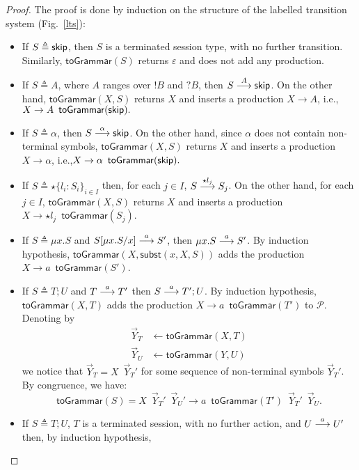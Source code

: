 \begin{proof}
The proof is done by induction on the structure of the labelled 
transition system (Fig.~\ref{lts}):
\begin{itemize}
	\item If $S\triangleq \skipk$, then $S$ is a terminated 
	      session type, with no further transition. Similarly, 
	      $\mathsf{toGrammar}(S)$ returns $\varepsilon$ and 
	      does not add any production.
	\item If $S\triangleq A$, where $A$ ranges over $!B$ and $?B$, 
	      then $S  \LTSderives[A] \skipk$. On the other hand, 
	      $\mathsf{toGrammar}(X,S)$ returns $X$ and inserts a production $X\rightarrow A$, 
	      i.e., $X\rightarrow A \enspace  \mathsf{toGrammar}(\skipk).$  
	\item If $S \triangleq \alpha$, then $S   \LTSderives[\alpha] \skipk$. 
	      On the other hand, since $\alpha$ does not contain non-terminal 
	      symbols, $\mathsf{toGrammar}(X,S)$ returns $X$ and inserts a production 
	      $X\rightarrow \alpha$, i.e.,\linebreak  $X\rightarrow \alpha \enspace 
	      \mathsf{toGrammar}(\skipk).$
	\item If $S\triangleq \star\{l_i\colon S_i\}_{i\in I}$ then, for each 
          $j\in I$, $S \LTSderives[\star l_j] S_j$. On the other hand, 
          for each $j\in I$, $\mathsf{toGrammar}(X,S)$ returns $X$ and  inserts a production 
          $X\rightarrow \star l_j \enspace \mathsf{toGrammar}(S_j)$.
	\item If $S\triangleq \mu x.S$ and $S[\mu x.S/x] \LTSderives[a] S'$, 
	      then $\mu x.S \LTSderives[a] S'$. By induction hypothesis, 
	      $\mathsf{toGrammar}(X,\mathsf{subst}(x,X,S))$ adds the production 
	      $X \rightarrow a\enspace  \mathsf{toGrammar}(S')$.
	\item If $S\triangleq T;U$ and $T \LTSderives[a] T'$ then $S \LTSderives[a] T';U$. 
	      By induction hypothesis, $\mathsf{toGrammar}(X,T)$ adds the production 
	      $X\rightarrow a \enspace \mathsf{toGrammar}(T')$ to $\mathcal P$.
		Denoting by 
		\begin{align*}
			\vec Y_T &\leftarrow \mathsf{toGrammar}(X,T)\\
			\vec Y_U &\leftarrow \mathsf{toGrammar}(Y,U)
		\end{align*}
		we notice that $\vec Y_T = X \enspace \vec Y_T'$ for some 
		sequence of non-terminal symbols $\vec Y_T'$. By congruence, we have: 
		\[\mathsf{toGrammar}(S) = X \enspace \vec Y_T' \enspace \vec Y_U' 
		\rightarrow a \enspace \mathsf{toGrammar}(T') \enspace \vec  Y_T' 
		\enspace \vec Y_U.\]
	\item If $S\triangleq T;U$, $T$ is a terminated session, with no further 
	      action, and $U \LTSderives[a] U'$ then, by induction hypothesis, 
	

\end{itemize}
\end{proof}
